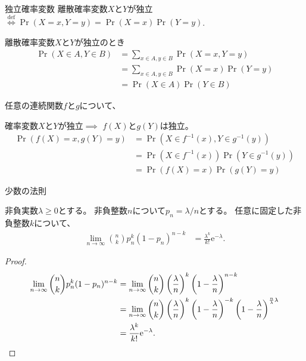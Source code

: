 \documentclass[lualatex,handout]{beamer}
\theoremstyle{definition}
\begin{document}
\begin{frame}{独立確率変数}
離散確率変数$X$と$Y$が独立$\stackrel{\mathrm{def}}{\iff}\Pr(X= x,Y= y)=\Pr(X= x)\Pr(Y= y)$.

\vspace{.5em}
離散確率変数$X$と$Y$が独立のとき
\begin{align*}
\Pr(X\in A,Y\in B)&=
\sum_{x\in A, y\in B} \Pr(X=x,Y=y)\\
&= \sum_{x\in A, y\in B} \Pr(X=x)\Pr(Y=y)\\
&= \Pr(X\in A)\Pr(Y\in B)
\end{align*}

任意の連続関数$f$と$g$について、

確率変数$X$と$Y$が独立$\implies$ $f(X)$と$g(Y)$は独立。
\begin{align*}
\Pr(f(X) = x, g(Y) = y) &= 
\Pr(X \in f^{-1}(x), Y \in g^{-1}(y))\\
&=\Pr(X \in f^{-1}(x))\Pr(Y \in g^{-1}(y))\\
&=\Pr(f(X) = x)\Pr(g(Y) = y)
\end{align*}
\end{frame}

\begin{frame}{少数の法則}
\begin{theorem}[少数の法則]
非負実数$\lambda\ge 0$とする。
非負整数$n$について$p_n=\lambda/n$とする。
任意に固定した非負整数$k$について、
\begin{align*}
\lim_{n\to\infty} \binom{n}{k} p_n^k(1-p_n)^{n-k} &= \frac{\lambda^k}{k!}\mathrm{e}^{-\lambda}.
\end{align*}
\end{theorem}
\begin{proof}
\begin{align*}
\lim_{n\to\infty} \binom{n}{k} p_n^k(1-p_n)^{n-k} &= \lim_{n\to\infty} \binom{n}{k} \left(\frac{\lambda}{n}\right)^k\left(1-\frac{\lambda}{n}\right)^{n-k}\\
&= \lim_{n\to\infty} \binom{n}{k} \left(\frac{\lambda}{n}\right)^k\left(1-\frac{\lambda}{n}\right)^{-k}\left(1-\frac{\lambda}{n}\right)^{\frac{n}{\lambda}\lambda}\\
&= \frac{\lambda^k}{k!} \mathrm{e}^{-\lambda}.\qedhere
\end{align*}
\end{proof}
\end{frame}
\end{document}
